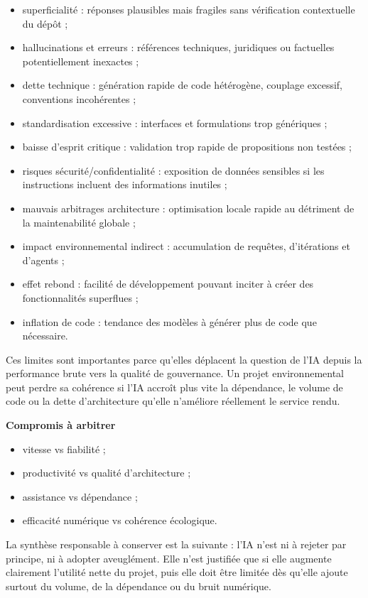 \documentclass[
  10pt,
  a4paper,
  DIV=11,
  numbers=noendperiod,
  oneside]{scrreprt}
\providecommand{\tightlist}{%
  \setlength{\itemsep}{0pt}\setlength{\parskip}{0pt}}
\let\oldtextbf\textbf
\renewcommand{\textbf}[1]{\oldtextbf{\textcolor{cmmnavy}{#1}}}
\begin{document}
\begin{itemize}
\tightlist
\item
  superficialité : réponses plausibles mais fragiles sans vérification
  contextuelle du dépôt ;
\item
  hallucinations et erreurs : références techniques, juridiques ou
  factuelles potentiellement inexactes ;
\item
  dette technique : génération rapide de code hétérogène, couplage
  excessif, conventions incohérentes ;
\item
  standardisation excessive : interfaces et formulations trop génériques
  ;
\item
  baisse d'esprit critique : validation trop rapide de propositions non
  testées ;
\item
  risques sécurité/confidentialité : exposition de données sensibles si
  les instructions incluent des informations inutiles ;
\item
  mauvais arbitrages architecture : optimisation locale rapide au
  détriment de la maintenabilité globale ;
\item
  impact environnemental indirect : accumulation de requêtes,
  d'itérations et d'agents ;
\item
  effet rebond : facilité de développement pouvant inciter à créer des
  fonctionnalités superflues ;
\item
  inflation de code : tendance des modèles à générer plus de code que
  nécessaire.
\end{itemize}

Ces limites sont importantes parce qu'elles déplacent la question de
l'IA depuis la performance brute vers la qualité de gouvernance. Un
projet environnemental peut perdre sa cohérence si l'IA accroît plus
vite la dépendance, le volume de code ou la dette d'architecture qu'elle
n'améliore réellement le service rendu.

\textbf{Compromis à arbitrer}

\begin{itemize}
\tightlist
\item
  vitesse vs fiabilité ;
\item
  productivité vs qualité d'architecture ;
\item
  assistance vs dépendance ;
\item
  efficacité numérique vs cohérence écologique.
\end{itemize}

La synthèse responsable à conserver est la suivante : l'IA n'est ni à
rejeter par principe, ni à adopter aveuglément. Elle n'est justifiée que
si elle augmente clairement l'utilité nette du projet, puis elle doit
être limitée dès qu'elle ajoute surtout du volume, de la dépendance ou
du bruit numérique.
\end{document}
